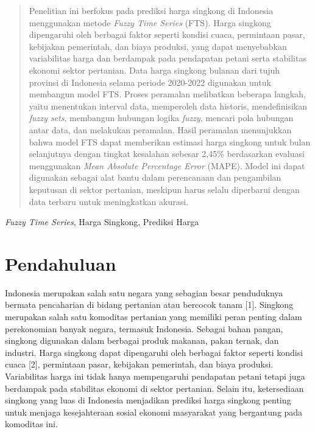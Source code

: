 \documentclass[conference]{IEEEtran}
\renewcommand{\headrulewidth}{0pt}
\renewcommand{\footrulewidth}{0.5pt}
\begin{document}
\begin{abstract}
    Penelitian ini berfokus pada prediksi harga singkong di Indonesia menggunakan metode \textit{Fuzzy Time Series} (FTS). Harga singkong dipengaruhi oleh berbagai faktor seperti kondisi cuaca, permintaan pasar, kebijakan pemerintah, dan biaya produksi, yang dapat menyebabkan variabilitas harga dan berdampak pada pendapatan petani serta stabilitas ekonomi sektor pertanian. Data harga singkong bulanan dari tujuh provinsi di Indonesia selama periode 2020-2022 digunakan untuk membangun model FTS. Proses peramalan melibatkan beberapa langkah, yaitu menentukan interval data, memperoleh data historis, mendefinisikan \textit{fuzzy sets}, membangun hubungan logika \textit{fuzzy}, mencari pola hubungan antar data, dan melakukan peramalan. Hasil peramalan menunjukkan bahwa model FTS dapat memberikan estimasi harga singkong untuk bulan selanjutnya dengan tingkat kesalahan sebesar 2,45\% berdasarkan evaluasi menggunakan \textit{Mean Absolute Percentage Error} (MAPE). Model ini dapat digunakan sebagai alat bantu dalam perencanaan dan pengambilan keputusan di sektor pertanian, meskipun harus selalu diperbarui dengan data terbaru untuk meningkatkan akurasi.
\end{abstract}

\begin{IEEEkeywords}
\textit{Fuzzy Time Series}, Harga Singkong, Prediksi Harga
\end{IEEEkeywords}

\thispagestyle{fancy}
\fancyhf{}
\fancyfoot[C]{\thepage}
\renewcommand{\headrulewidth}{0pt}
\renewcommand{\footrulewidth}{0.5pt}
\section{Pendahuluan}
Indonesia merupakan salah satu negara yang sebagian besar penduduknya bermata pencaharian di bidang pertanian atau bercocok tanam [1]. Singkong merupakan salah satu komoditas pertanian yang memiliki peran penting dalam perekonomian banyak negara, termasuk Indonesia. Sebagai bahan pangan, singkong digunakan dalam berbagai produk makanan, pakan ternak, dan industri. Harga singkong dapat dipengaruhi oleh berbagai faktor seperti kondisi cuaca [2], permintaan pasar, kebijakan pemerintah, dan biaya produksi. Variabilitas harga ini tidak hanya mempengaruhi pendapatan petani tetapi juga berdampak pada stabilitas ekonomi di sektor pertanian. Selain itu, ketersediaan singkong yang luas di Indonesia menjadikan prediksi harga singkong penting untuk menjaga kesejahteraan sosial ekonomi masyarakat yang bergantung pada komoditas ini.
\end{document}
